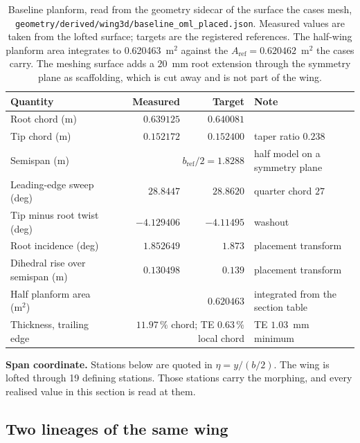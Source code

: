 \begin{table}[htbp]
  \centering
  \footnotesize
  \caption{Baseline planform, read from the geometry sidecar of the surface the cases mesh,
  \texttt{geometry/derived/wing3d/baseline\_oml\_placed.json}. Measured values are taken from the
  lofted surface; targets are the registered references. The half-wing planform area integrates
  to \num{0.620463}~m$^2$ against the $A_\mathrm{ref} = \num{0.620462}$~m$^2$ the cases carry.
  The meshing surface adds a $20$~mm root extension through the symmetry plane as scaffolding,
  which is cut away and is not part of the wing.}
  \label{tab:geom:planform}
  \begin{tabular}{lrrl}
    \toprule
    Quantity & Measured & Target & Note \\
    \midrule
    Root chord (m)                  & $0.639125$  & $0.640081$ & \\
    Tip chord (m)                   & $0.152172$  & $0.152400$ & taper ratio $0.238$ \\
    Semispan (m)                    & \multicolumn{2}{r}{$b_\mathrm{ref}/2 = 1.8288$} & half model on a symmetry plane \\
    Leading-edge sweep (deg)        & $28.8447$   & $28.8620$  & quarter chord $27$ \\
    Tip minus root twist (deg)      & $-4.129406$ & $-4.11495$ & washout \\
    Root incidence (deg)            & $1.852649$  & $1.873$    & placement transform \\
    Dihedral rise over semispan (m) & $0.130498$  & $0.139$    & placement transform \\
    Half planform area (m$^2$)      & \multicolumn{2}{r}{$0.620463$} & integrated from the section table \\
    Thickness, trailing edge        & \multicolumn{2}{r}{$11.97\,\%$ chord; TE $0.63\,\%$ local chord} & TE $1.03$~mm minimum \\
    \bottomrule
  \end{tabular}
\end{table}

\textbf{Span coordinate.} Stations below are quoted in $\eta = y/(b/2)$. The wing is lofted
through 19 defining stations. Those stations carry the morphing, and every realised value in this
section is read at them.

\subsection{Two lineages of the same wing}
\label{sec:geom:lineage}

